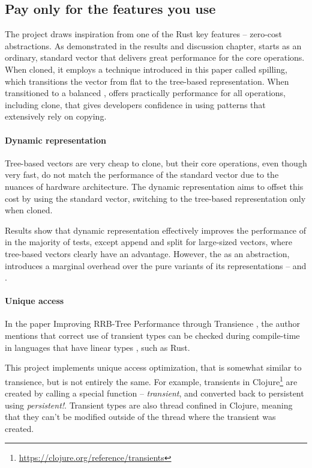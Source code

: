 \subsection{Pay only for the features you use}
The project draws inspiration from one of the Rust key features -- zero-cost abstractions. As demonstrated in the results and discussion chapter, \pvec{} starts as an ordinary, standard vector that delivers great performance for the core operations. When cloned, it employs a technique introduced in this paper called spilling, which transitions the vector from flat to the tree-based representation. When transitioned to a balanced \rrbvec{}, \pvec{} offers practically  performance for all operations, including clone, that gives developers confidence in using patterns that extensively rely on copying.

\paragraph{Dynamic representation}
Tree-based vectors are very cheap to clone, but their core operations, even though very fast, do not match the performance of the standard vector due to the nuances of hardware architecture. The dynamic representation aims to offset this cost by using the standard vector, switching to the tree-based representation only when cloned.

Results show that dynamic representation effectively improves the performance of \pvec{} in the majority of tests, except append and split for large-sized vectors, where tree-based vectors clearly have an advantage. However, the \pvec{} as an abstraction, introduces a marginal overhead over the pure variants of its representations -- \stdvec{} and \rrbvec{}.

\paragraph{Unique access}
In the paper Improving RRB-Tree Performance through Transience \cite{improving-performance-through-transience}, the author mentions that correct use of transient types can be checked during compile-time in languages that have linear types \cite{linear-types-can-change-the-world}, such as Rust.

This project implements unique access optimization, that is somewhat similar to transience, but is not entirely the same. For example, transients in Clojure\footnote{\url{https://clojure.org/reference/transients}} are created by calling a special function -- \emph{transient}, and converted back to persistent using \emph{persistent!}. Transient types are also thread confined in Clojure, meaning that they can't be modified outside of the thread where the transient was created.

